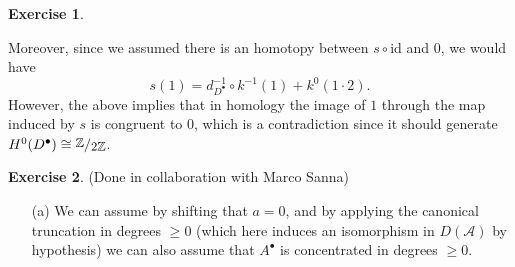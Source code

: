 \documentclass[a4paper]{article}
\newcommand{\Z}{\mathbb{Z}}
\newcommand{\ssfrac}[2]{
    \raisebox{+0.3ex}{\scalebox{0.9}{$#1$}}
    /
    \raisebox{-0.3ex}{\scalebox{0.9}{$#2$}}
}
\theoremstyle{definition}
\theoremstyle{definition}
\theoremstyle{remark}
\theoremstyle{definition}
\newtheorem{exercise}{Exercise}[section]
\begin{document}
\begin{exercise}
\begin{itemize}
			Moreover, since we
			assumed there is an homotopy between $s \circ \text{id}$ and $0$, we would have
			$$s(1)=d_{D^\bullet}^{-1}\circ k^{-1}(1)+k^0(1\cdot 2).$$
			However, the above implies that in homology the image of $1$ through the map induced by $s$ is congruent to $0$, which is a contradiction since
			it should generate $H^0(D^\bullet)\cong\ssfrac{\Z}{2\Z}$.
	\end{itemize}
\end{exercise}
\begin{exercise} (Done in collaboration with Marco Sanna)\

	\begin{itemize}
		\item[(a)] We can assume by shifting that $a=0$, and by applying the canonical truncation in degrees $\geq 0$ (which here induces an isomorphism in $D(\mathcal{A})$ by hypothesis) we can also assume that $A^\bullet$ is concentrated in
			degrees $\geq 0$.


\end{itemize}
\end{exercise}
\end{document}
